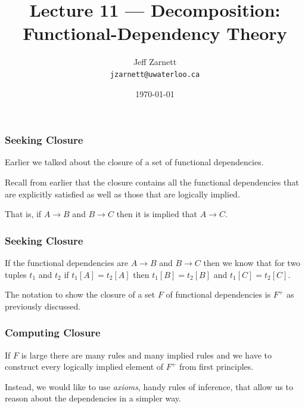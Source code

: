 

\title{Lecture  11 --- Decomposition: Functional-Dependency Theory }

\author{Jeff Zarnett \\ \small \texttt{jzarnett@uwaterloo.ca}}
\date{\today}




\begin{frame}
  \titlepage

 \end{frame}



\begin{frame}
\frametitle{Seeking Closure}

Earlier we talked about the closure of a set of functional dependencies. 

Recall from earlier that the closure contains all the functional dependencies that are explicitly satisfied as well as those that are logically implied. 

That is, if $A \rightarrow B$ and $B \rightarrow C$ then it is implied that $A \rightarrow C$.

\end{frame}



\begin{frame}
\frametitle{Seeking Closure}
If the functional dependencies are $A \rightarrow B$ and $B \rightarrow C$ then we know that for two tuples $t_{1}$ and $t_{2}$ if $t_{1}[A] = t_{2}[A]$ then $t_{1}[B] = t_{2}[B]$ and $t_{1}[C] = t_{2}[C]$. 

The notation to show the closure of a set $F$ of functional dependencies is $F^{+}$ as previously discussed.

\end{frame}


\begin{frame}
\frametitle{Computing Closure}

If $F$ is large there are many rules and many implied rules and we have to construct every logically implied element of $F^{+}$ from first principles. 

Instead, we would like to use \textit{axioms}, handy rules of inference, that allow us to reason about the dependencies in a simpler way. 


\end{frame}


